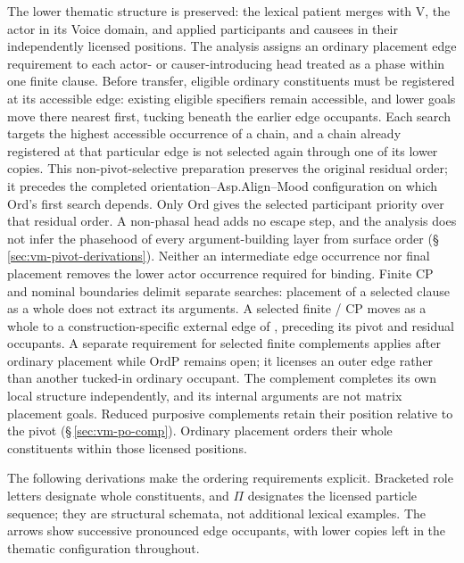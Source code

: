 The lower thematic structure is preserved: the lexical patient merges with
 V, the actor in its Voice domain, and applied participants and causees in
 their independently licensed positions. The analysis assigns an ordinary
 placement edge requirement to each actor- or causer-introducing head treated
 as a phase within one finite clause. Before transfer, eligible ordinary
 constituents must be registered at its accessible edge: existing eligible
 specifiers remain accessible, and lower goals move there nearest first,
 tucking beneath the earlier edge occupants. Each search targets the highest
 accessible occurrence of a chain, and a chain already registered at that
 particular edge is not selected again through one of its lower copies.
 This non-pivot-selective preparation preserves the original residual order; it precedes the completed
 orientation--Asp.Align--Mood configuration on which Ord's first search
 depends. Only Ord gives the selected participant priority over that residual
 order. A non-phasal head adds no escape step, and the analysis does not infer
 the phasehood of every argument-building layer from surface order
 (§\,\ref{sec:vm-pivot-derivations}). Neither an intermediate edge occurrence
 nor final placement removes the lower actor occurrence required for binding. Finite CP and nominal boundaries delimit separate searches:
 placement of a selected clause as a whole does not extract its arguments.
 A selected finite / CP moves as a whole to a
 construction-specific external edge of , preceding its
 pivot and residual occupants. A separate requirement for selected finite complements
 applies after ordinary placement while OrdP remains open;
 it licenses an outer edge rather than another tucked-in ordinary occupant.
 The complement completes its own local structure independently, and its
 internal arguments are not matrix placement goals. Reduced
 purposive complements retain their position relative to the pivot (§\,\ref{sec:vm-po-comp}). Ordinary
 placement orders their whole constituents within those licensed positions.

The following derivations make the ordering requirements explicit. Bracketed
 role letters designate whole constituents, and $\Pi$ designates the licensed
 particle sequence; they are structural schemata, not additional lexical
 examples. The arrows show successive pronounced edge occupants, with lower
 copies left in the thematic configuration throughout.

